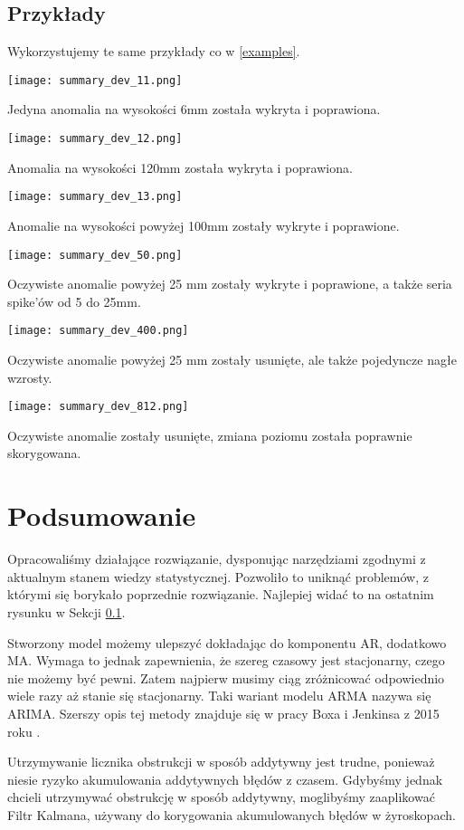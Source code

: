 \subsection{Przykłady}\label{exampless}
Wykorzystujemy te same przykłady co w \ref{examples}.

\texttt{[image: summary\_dev\_11.png]}

Jedyna anomalia na wysokości 6mm została wykryta i poprawiona.

\texttt{[image: summary\_dev\_12.png]}

Anomalia na wysokości 120mm została wykryta i poprawiona.

\texttt{[image: summary\_dev\_13.png]}

Anomalie na wysokości powyżej 100mm zostały wykryte i poprawione.

\texttt{[image: summary\_dev\_50.png]}

Oczywiste anomalie powyżej 25 mm zostały wykryte i poprawione, a także seria spike'ów od 5 do 25mm.

\texttt{[image: summary\_dev\_400.png]}

Oczywiste anomalie powyżej 25 mm zostały usunięte, ale także pojedyncze nagłe wzrosty.

\texttt{[image: summary\_dev\_812.png]}

Oczywiste anomalie zostały usunięte, zmiana poziomu została poprawnie skorygowana.

\section{Podsumowanie}
Opracowaliśmy działające rozwiązanie, dysponując narzędziami zgodnymi z aktualnym stanem wiedzy statystycznej. Pozwoliło to uniknąć problemów, z którymi się borykało poprzednie rozwiązanie. Najlepiej widać to na ostatnim rysunku w Sekcji \ref{exampless}.

Stworzony model możemy ulepszyć dokładając do komponentu AR, dodatkowo MA. Wymaga to jednak zapewnienia, że szereg czasowy jest stacjonarny, czego nie możemy być pewni. Zatem najpierw musimy ciąg zróżnicować odpowiednio wiele razy aż stanie się stacjonarny. Taki wariant modelu ARMA nazywa się ARIMA. Szerszy opis tej metody znajduje się w pracy Boxa i Jenkinsa z 2015 roku \cite{arima}.

Utrzymywanie licznika obstrukcji w sposób addytywny jest trudne, ponieważ niesie ryzyko akumulowania addytywnych błędów z czasem. Gdybyśmy jednak chcieli utrzymywać obstrukcję w sposób addytywny, moglibyśmy zaaplikować Filtr Kalmana, używany do korygowania akumulowanych błędów w żyroskopach.